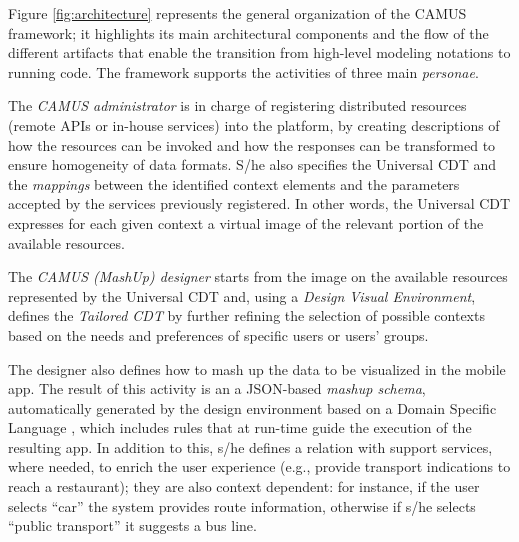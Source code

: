 Figure \ref{fig:architecture} represents the general organization of the CAMUS framework; it highlights its main architectural components and the flow of the different artifacts that enable the transition from high-level modeling notations to running code.
The framework supports the activities of three main \emph{personae}.

The \emph{CAMUS administrator} is in charge of registering distributed resources (remote APIs or in-house services) into the platform, by creating descriptions of how the resources can be invoked and how the responses can be transformed to ensure homogeneity of data formats. S/he also specifies the Universal CDT and the \emph{mappings} between the identified context elements and the parameters accepted by the services previously registered.
In other words, the Universal CDT expresses for each given context a virtual image of the relevant portion of the available resources.

The \emph{CAMUS (MashUp) designer} starts from the image on the available resources represented by the Universal CDT and, using a \emph{Design Visual Environment}, defines the \emph{Tailored CDT} by further refining the selection of possible contexts based on the needs and preferences of specific users or users' groups. %

The designer also defines how to mash up the data to be visualized in
the mobile app. The result of this activity is an a JSON-based
\emph{mashup schema}, automatically generated by the design
environment based on a {Domain Specific Language
\cite{journals/TWEB2015/CappielloMP15}}, which includes rules that at run-time guide the execution
of the resulting app.
In addition to this, s/he defines a relation with support services,
where needed, to enrich the user experience (e.g., provide transport
indications to reach a restaurant); they are also context dependent:
for instance, if the user selects ``car'' the system provides route
information, otherwise if s/he selects ``public transport'' it suggests
a bus line.


